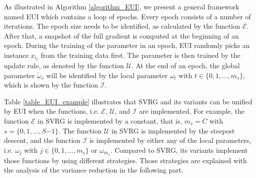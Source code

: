 \documentclass[letterpaper]{article}
\begin{document}
As illustrated in Algorithm \ref{algorithm_EUI}, we present a general framework named EUI which contains a loop of epochs. Every epoch consists of a number of iterations.  The epoch size  needs to be identified, as calculated by the function $\mathcal{E}$.  After that, a  snapshot of the full gradient is computed at the beginning of an epoch. During the training of the parameter in an epoch, EUI randomly picks an instance $x_{i_t}$ from the training data first. The parameter is then trained  by the update rule, as denoted by the function $\mathcal{U}$.  At the end of an epoch,  the global parameter $\tilde{\omega}_s$ will be identified by the local parameter $\omega_t$ with $t\in\{0, 1,..., m_s\}$, which is shown by the function $\mathcal{I}$.  

Table \ref{table_EUI_example} illustrates that SVRG and  its variants can be unified by EUI when  the functions, i.e. $\mathcal{E}$, $\mathcal{U}$, and $\mathcal{I}$ are implemented. For example,  the function $\mathcal{E}$ in SVRG is implemented by a constant, that is, $m_s\mathrm{=}C$ with $s\mathrm{=}\{0,1, ..., S\mathrm{-}1\}$. The function $\mathcal{U}$ in SVRG is  implemented by the steepest descent, and the function $\mathcal{I}$ is implemented by either any of the local parameters, i.e. $\omega_j$ with $j\in\{0,1, ..., m_s\}$ or $\omega_{m_s}$.  Compared to  SVRG, its variants implement those functions by using different strategies. Those strategies are explained with the analysis of the variance reduction in the following part. 

\end{document}
